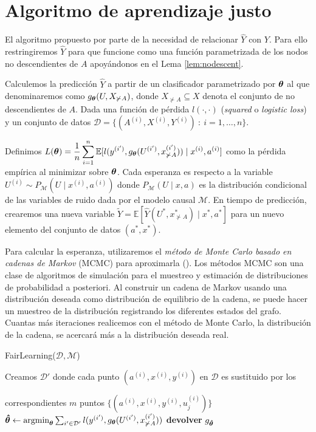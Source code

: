 \documentclass[oneside,openright,titlepage,numbers=noenddot,openany,headinclude,footinclude=true,
cleardoublepage=empty,abstractoff,BCOR=5mm,paper=a4,fontsize=12pt,main=spanish]{scrreprt}
\begin{document}
\section{Algoritmo de aprendizaje justo}

\label{sec:algoritmo}

El algoritmo propuesto por \cite{counterfactual2018} parte de la necesidad de relacionar $\hat{Y}$ con $Y$. Para ello restringiremos $\hat{Y}$ para que funcione como una función parametrizada de los nodos no descendientes de $A$ apoyándonos en el Lema \ref{lem:nodescent}. 

Calculemos la predicción $\hat{Y}$ a partir de un clasificador parametrizado por $\bm{\theta}$ al que denominaremos como $g_{\bm{\theta}}(U,X_{\not \succ A})$, donde $X_{\not \succ A} \subseteq X$ denota el conjunto de no descendientes de $A$. Dada una función de pérdida $l(\cdot,\cdot)$ (\textit{squared} o \textit{logistic loss}) y un conjunto de datos $\mathcal{D}=\{(A^{(i)},X^{(i)},Y^{(i)}) \ : \ i=1,\dots,n\}$. 

Definimos $L(\bm{\theta})=\displaystyle \frac{1}{n} \sum_{i=1}^n \mathbb{E}[l(y^{(i')},g_{\bm{\theta}}(U^{(i')},x_{\not \succ A}^{(i')}))\mid x^{(i)},a^{(i)}]$ como la pérdida empírica al minimizar sobre $\bm{\theta}$. Cada esperanza es respecto a la variable $U^{(i)} \sim P_{\mathcal{M}}(U \mid x^{(i)},a^{(i)})$ donde $P_{\mathcal{M}}(U \mid x,a)$ es la distribución condicional de las variables de ruido dada por el modelo causal $\mathcal{M}$. En tiempo de predicción, crearemos una nueva variable $\tilde{Y}=\mathbb{E}[\hat{Y}(U^\ast,x_{\not \succ A}^\ast)\mid x^\ast, a^\ast]$ para un nuevo elemento del conjunto de datos $(a^\ast,x^\ast)$. 

Para calcular la esperanza, utilizaremos el \textit{método de Monte Carlo basado en cadenas de Markov} (MCMC) para aproximarla (\cite{mcmc2003}). Los métodos MCMC son una clase de algoritmos de simulación para el muestreo y estimación de distribuciones de probabilidad a posteriori. Al construir un cadena de Markov usando una distribución deseada como distribución de equilibrio de la cadena, se puede hacer un muestreo de la distribución registrando los diferentes estados del grafo. Cuantas más iteraciones realicemos con el método de Monte Carlo, la distribución de la cadena, se acercará más a la distribución deseada real.

\begin{algorithm}[h]
\caption{FairLearning($\mathcal{D},\mathcal{M}$)}
\label{alg:fairlearn}
    Creamos $\mathcal{D}'$ donde cada punto $(a^{(i)},x^{(i)},y^{(i)})$ en $\mathcal{D}$ es sustituido por los 
    
    correspondientes $m$ puntos $\{(a^{(i)},x^{(i)},y^{(i)},u_j^{(i)})\}$\;
    $\bm{\hat{\theta}} \leftarrow \text{argmin}_{\bm{\theta}} \sum_{i'\in \mathcal{D}'} l(y^{(i')},g_{\bm{\theta}}(U^{(i')},x_{\not \succ A}^{(i')}))$\;
   \textbf{devolver} $g_{\bm{\hat{\theta}}}$\;
\end{algorithm}
\end{document}
